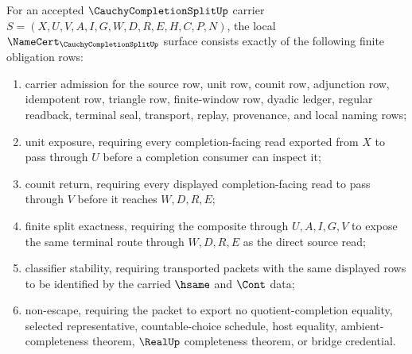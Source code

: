 \begin{theorem}
\label{thm:cauchy-completion-split-namecert-obligations}
For an accepted $\CauchyCompletionSplitUp$ carrier $S=(X,U,V,A,I,G,W,D,R,E,H,C,P,N)$, the local $\NameCert_{\CauchyCompletionSplitUp}$ surface consists exactly of the following finite obligation rows:
\begin{enumerate}
\item carrier admission for the source row, unit row, counit row, adjunction row, idempotent row, triangle row, finite-window row, dyadic ledger, regular readback, terminal seal, transport, replay, provenance, and local naming rows;
\item unit exposure, requiring every completion-facing read exported from $X$ to pass through $U$ before a completion consumer can inspect it;
\item counit return, requiring every displayed completion-facing read to pass through $V$ before it reaches $W,D,R,E$;
\item finite split exactness, requiring the composite through $U,A,I,G,V$ to expose the same terminal route through $W,D,R,E$ as the direct source read;
\item classifier stability, requiring transported packets with the same displayed rows to be identified by the carried $\hsame$ and $\Cont$ data;
\item non-escape, requiring the packet to export no quotient-completion equality, selected representative, countable-choice schedule, host equality, ambient-completeness theorem, $\RealUp$ completeness theorem, or bridge credential.
\end{enumerate}
\end{theorem}
